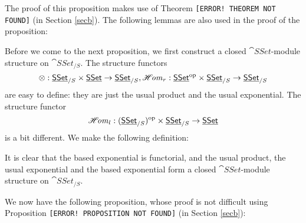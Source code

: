 The proof of this proposition makes use of Theorem {\color{FF0000}\texttt{[ERROR! THEOREM NOT FOUND]}} (in Section \ref{secb}).
The following lemmas are also used in the proof of the proposition:



Before we come to the next proposition, we first construct a closed $\cat{SSet}$-module structure on $\cat{SSet}_{/S}$. 
The structure functors $$\otimes:\underline{\smash{\mathsf{SSet}}}_{/S}\times\underline{\smash{\mathsf{SSet}}}\to\underline{\smash{\mathsf{SSet}}}_{/S},\operatorname{\mathscr{H}\mkern-3mu\mathit{om}}_r:\underline{\smash{\mathsf{SSet}}}^{\mathrm{op}}\times\underline{\smash{\mathsf{SSet}}}_{/S}\to\underline{\smash{\mathsf{SSet}}}_{/S}$$
are easy to define: they are just the usual product and the usual exponential. The structure functor
$$\operatorname{\mathscr{H}\mkern-3mu\mathit{om}}_l:(\underline{\smash{\mathsf{SSet}}}_{/S})^{\mathrm{op}}\times\underline{\smash{\mathsf{SSet}}}_{/S}\to\underline{\smash{\mathsf{SSet}}}$$ is a bit different. We make the following definition:


It is clear that the based exponential is functorial, and the usual product, the usual exponential and the based exponential
form a closed $\cat{SSet}$-module structure on $\cat{SSet}_{/S}$. 

We now have the following proposition, whose proof is not difficult using Proposition 
{\color{FF0000}\texttt{[ERROR! PROPOSITION NOT FOUND]}} (in Section \ref{secb}):

